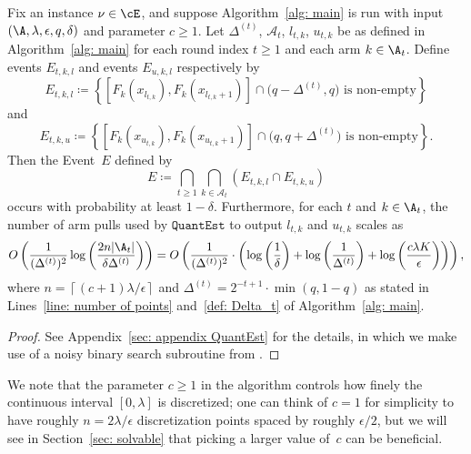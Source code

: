  
\begin{lemma}
\label{lem: good events}
    Fix an instance $\nu \in \cE$, and suppose Algorithm~\ref{alg: main} is run with input $(\A, \lambda, \epsilon, q, \delta)$ and parameter $c \ge 1$.
     Let $\Delta^{(t)}$, $\mathcal{A}_t$, $l_{t, k}$, $u_{t, k}$ be as defined in Algorithm~\ref{alg: main} for each round index $t \ge 1$ and each arm $k \in \A_t$.
     Define events $E_{t, k, l}$ and events $E_{u, k, l}$ respectively by
    \begin{equation}
    \label{eq: event Etkl}
        E_{t, k, l} \coloneqq
        \left\{
        [F_k(x_{l_{t, k}}), F_k(x_{l_{t, k}+1})] \cap  
        \big( q - \Delta^{(t)}, q   \big) 
        \text{ is non-empty}
        \right\}
    \end{equation}
    and
     \begin{equation}
      \label{eq: event Etku}
        E_{t, k, u} \coloneqq
        \left\{
        [F_k(x_{u_{t, k}}), F_k(x_{u_{t, k}+1})] \cap  
        \big( q, q + \Delta^{(t)}  \big) 
        \text{ is non-empty}
        \right\}.
    \end{equation}
    Then the Event~$E$ defined by
    \begin{equation}
        E \coloneqq 
        \bigcap_{t \ge 1}
        \bigcap_{k \in \mathcal{A}_t} 
        \left(
        E_{t, k, l}
        \cap
        E_{t, k, u}
        \right)
    \end{equation}    
    occurs with probability at least $1 - \delta$.
    Furthermore, for each $t$ and $k \in \A_t$, the number of arm pulls used by $\mathtt{QuantEst}$ to output $l_{t,k}$ and $u_{t, k}$ scales as 
    \begin{equation}
    \label{eq: QuantEst arm pulls}
        O\left(
    \frac{1}{(\Delta^{(t)})^2} 
    \log 
    \left(
    \frac{2n  |\A_t| }{ \delta \Delta^{(t)}}
    \right)
    \right)
    =
    O\left(
    \frac{1}{(\Delta^{(t)})^2} 
    \cdot
    \left( 
     \log \left(\frac{1}{ \delta } \right) +
     \log \left(\frac{1}{ \Delta^{(t)}}\right) +
     \log \left(\frac{c \lambda K}{ \epsilon } \right)
    \right)
    \right),
    \end{equation}
    where $n =\left\lceil (c+1) \lambda/\epsilon \right\rceil$ and $\Delta^{(t)}= 2^{-t+1} \cdot \min(q, 1-q)$ as stated in Lines~\ref{line: number of points} and~\ref{def: Delta_t} of Algorithm~\ref{alg: main}.
\end{lemma}
\begin{proof}
    See Appendix~\ref{sec: appendix QuantEst} for the details, in which we make use of a noisy binary search subroutine from \cite{gretta2023sharp}.
\end{proof}
\begin{remark}
    \label{rem: input c}
    We note that the parameter $c \ge 1$ in the algorithm controls how finely the continuous interval $[0,\lambda]$ is discretized; one can think of $c=1$ for simplicity to have roughly $n = 2\lambda/\epsilon$ discretization points spaced by roughly $\epsilon/2$, but we will see in Section~\ref{sec: solvable} that picking a larger value of~$c$ can be beneficial.
\end{remark}




